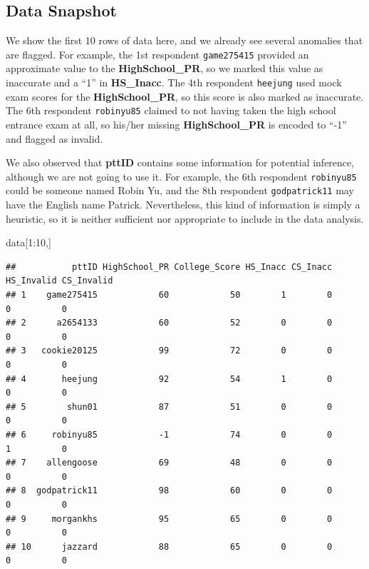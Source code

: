 \documentclass[
]{article}
\newenvironment{Shaded}{\begin{snugshade}}{\end{snugshade}}
\newcommand{\DecValTok}[1]{\textcolor[rgb]{0.00,0.00,0.81}{#1}}
\newcommand{\NormalTok}[1]{#1}
\newcommand{\SpecialCharTok}[1]{\textcolor[rgb]{0.00,0.00,0.00}{#1}}
\begin{document}
\hypertarget{data-snapshot}{%
\subsection{Data Snapshot}\label{data-snapshot}}

We show the first 10 rows of data here, and we already see several
anomalies that are flagged. For example, the 1st respondent
\texttt{game275415} provided an approximate value to the
\textbf{HighSchool\_PR}, so we marked this value as inaccurate and a
``1'' in \textbf{HS\_Inacc}. The 4th respondent \texttt{heejung} used
mock exam scores for the \textbf{HighSchool\_PR}, so this score is also
marked as inaccurate. The 6th respondent \texttt{robinyu85} claimed to
not having taken the high school entrance exam at all, so his/her
missing \textbf{HighSchool\_PR} is encoded to ``-1'' and flagged as
invalid.

We also observed that \textbf{pttID} contains some information for
potential inference, although we are not going to use it. For example,
the 6th respondent \texttt{robinyu85} could be someone named Robin Yu,
and the 8th respondent \texttt{godpatrick11} may have the English name
Patrick. Nevertheless, this kind of information is simply a heuristic,
so it is neither sufficient nor appropriate to include in the data
analysis.

\begin{Shaded}
\begin{Highlighting}[]
\NormalTok{data[}\DecValTok{1}\SpecialCharTok{:}\DecValTok{10}\NormalTok{,]}
\end{Highlighting}
\end{Shaded}

\begin{verbatim}
##           pttID HighSchool_PR College_Score HS_Inacc CS_Inacc HS_Invalid CS_Invalid
## 1    game275415            60            50        1        0          0          0
## 2      a2654133            60            52        0        0          0          0
## 3   cookie20125            99            72        0        0          0          0
## 4       heejung            92            54        1        0          0          0
## 5        shun01            87            51        0        0          0          0
## 6     robinyu85            -1            74        0        0          1          0
## 7    allengoose            69            48        0        0          0          0
## 8  godpatrick11            98            60        0        0          0          0
## 9     morgankhs            95            65        0        0          0          0
## 10      jazzard            88            65        0        0          0          0
\end{verbatim}
\end{document}
